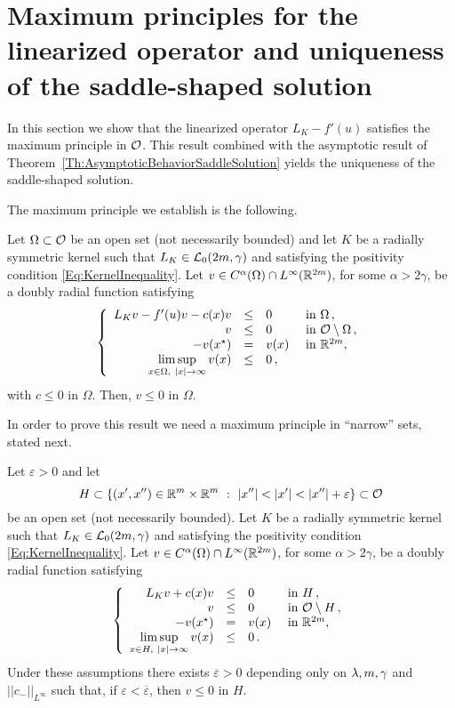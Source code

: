 \section{Maximum principles for the linearized operator and uniqueness of the saddle-shaped solution}
\label{Sec:MaximumPrinciple}

In this section we show that the linearized operator $L_K  -f'(u)$ satisfies the maximum principle in $\mathcal{O}$. This result combined with the asymptotic result of Theorem~\ref{Th:AsymptoticBehaviorSaddleSolution} yields the uniqueness of the saddle-shaped solution.

The maximum principle we establish is the following.

\begin{proposition}
	\label{Prop:MaximumPrincipleLinearized}
	Let $\Omega \subset \mathcal{O}$ be an open set (not necessarily bounded) and let $K$ be a radially symmetric kernel such that $L_K\in \mathcal{L}_0(2m,\gamma)$ and satisfying the positivity condition \eqref{Eq:KernelInequality}. Let $v\in C^\alpha(\Omega)\cap L^\infty(\mathbb{R}^{2m})$, for some $\alpha > 2\gamma$, be a doubly radial function satisfying
	$$
	\left\{\begin{array}{rcll}
	L_K v - f'(u)v - c(x)v &\leq & 0 &\textrm{ in } \Omega\,,\\
	v &\leq & 0 &\textrm{ in } \mathcal{O} \setminus \Omega\,,\\
	- v(x^\star) & = & v(x) &\textrm{ in } \mathbb{R}^{2m},\\
	\displaystyle \limsup_{x\in \Omega, \ |x|\to \infty} v(x) &\leq & 0\,,
	\end{array} \right.
	$$
	with $c\leq 0$ in $\Omega$.
	Then, $v \leq 0$ in $\Omega$.
\end{proposition}

In order to prove this result we need a maximum principle in ``narrow'' sets, stated next.

\begin{proposition}
	\label{Prop:MaximumPrincipleNarrowDomainsOdd}
	Let $\varepsilon>0$ and let
	$$
	H \subset \{(x',x'')\in \R^m\times\R^m \ : \ |x''|<|x'|<|x''|+ \varepsilon\} \subset \ocal
	$$ 
	be an open set (not necessarily bounded).  
	Let $K$ be a radially symmetric kernel such that $L_K\in \mathcal{L}_0(2m,\gamma)$ and satisfying the positivity condition \eqref{Eq:KernelInequality}. Let $v\in C^\alpha(\Omega)\cap L^\infty(\mathbb{R}^{2m})$, for some $\alpha > 2\gamma$, be a doubly radial function satisfying
	\begin{equation}
	\label{Eq:AssumptionsMaxPNarrow}
	\left\{\begin{array}{rcll}
	L_K v + c(x)v&\leq & 0 &\textrm{ in } H\,,\\
	v &\leq & 0 &\textrm{ in } \mathcal{O} \setminus H\,,\\
	- v(x^\star) & = & v(x) &\textrm{ in } \mathbb{R}^{2m},\\
	\displaystyle \limsup_{x\in H, \ |x|\to \infty} v(x) &\leq & 0\,.
	\end{array} \right.
	\end{equation}
	Under these assumptions there exists $\overline{\varepsilon}>0$ depending only on $\lambda, m, \gamma$ and $||c_-||_{L^\infty}$ such that, if $\varepsilon<\overline{\varepsilon}$, then $v \leq 0$ in $H$. 
\end{proposition}

